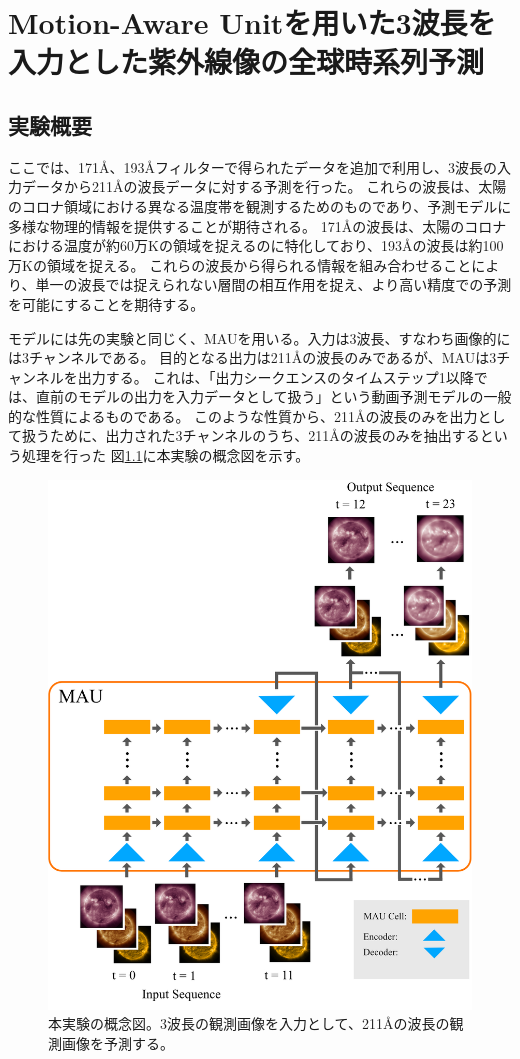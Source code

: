 \chapter{Motion-Aware Unitを用いた3波長を入力とした紫外線像の全球時系列予測}
  \section{実験概要}
    ここでは、171Å、193Åフィルターで得られたデータを追加で利用し、3波長の入力データから211Åの波長データに対する予測を行った。
    これらの波長は、太陽のコロナ領域における異なる温度帯を観測するためのものであり、予測モデルに多様な物理的情報を提供することが期待される。
    171Åの波長は、太陽のコロナにおける温度が約60万Kの領域を捉えるのに特化しており、193Åの波長は約100万Kの領域を捉える。
    これらの波長から得られる情報を組み合わせることにより、単一の波長では捉えられない層間の相互作用を捉え、より高い精度での予測を可能にすることを期待する。
    
    モデルには先の実験と同じく、MAUを用いる。入力は3波長、すなわち画像的には3チャンネルである。
    目的となる出力は211Åの波長のみであるが、MAUは3チャンネルを出力する。
    これは、「出力シークエンスのタイムステップ1以降では、直前のモデルの出力を入力データとして扱う」という動画予測モデルの一般的な性質によるものである。
    このような性質から、211Åの波長のみを出力として扱うために、出力された3チャンネルのうち、211Åの波長のみを抽出するという処理を行った
    図\ref{fig:exp2_concept}に本実験の概念図を示す。
    \begin{figure}[htbp]
      \centering
      \includegraphics[width=\textwidth]{figures/exp2/exp2_concept.jpg}
      \caption{本実験の概念図。3波長の観測画像を入力として、211Åの波長の観測画像を予測する。}
      \label{fig:exp2_concept}
    \end{figure}

